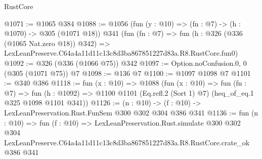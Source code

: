 \begin{lexlean}{RustCore}
\begin{coremodule}
@1071 := @1065 @384
@1088 := @1056
    (fun (y : @10) => (fn : @7) -> (h : @1070) -> @305 (@1071 @18))
    @341
    (fun (fn : @7) =>
    fun (h : @326 (@336 (@1065 Nat.zero @18)) @342) =>
    LexLeanPreserve.C64a4a11d11c13c8d3ba867851227d83a.R8.RustCore.fun0)
@1092 := @326 (@336 (@1066 @75)) @342
@1097 := Option.noConfusion.{0, 0} (@305 (@1071 @75)) @7
@1098 := @136 @7
@1100 := @1097 @1098 @7
@1101 := @340 @386
@1118 := fun (x : @10) =>
  @1088
    (fun (x : @10) =>
    fun (fn : @7) =>
    fun (h : @1092) => @1100 @1101 (Eq.refl.{2} (Sort 1) @7) (heq_of_eq.{1} @325 @1098 @1101 @341))
@1126 := (n : @10) -> (f : @10) -> LexLeanPreservation.Rust.FunSem @300 @302 @304 @386 @341
@1136 := fun (n : @10) =>
  fun (f : @10) =>
  LexLeanPreservation.Rust.simulate
    @300
    @302
    @304
    LexLeanPreserve.C64a4a11d11c13c8d3ba867851227d83a.R8.RustCore.crate_ok
    @386
    @341
\end{coremodule}
\end{lexlean}
